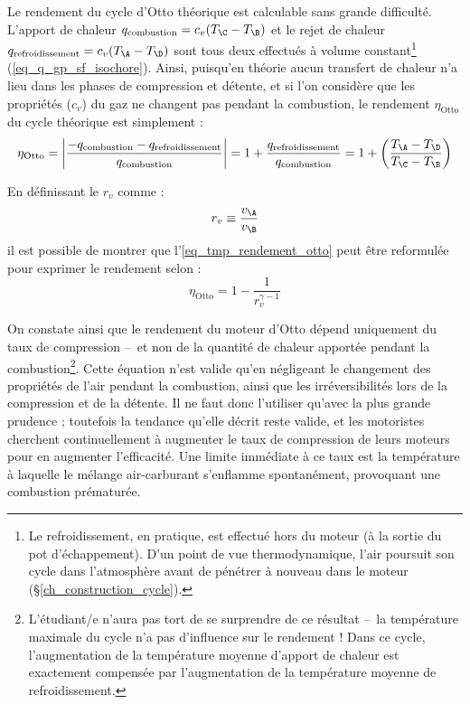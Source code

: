 		Le rendement du cycle d’Otto théorique est calculable sans grande difficulté. L’apport de chaleur $q_\text{combustion} = c_v (T_\C - T_\B )$ et le rejet de chaleur $q_\text{refroidissement} = c_v (T_\A - T_\D)$ sont tous deux effectués à volume constant\footnote{Le refroidissement, en pratique, est effectué hors du moteur (à la sortie du pot d’échappement). D’un point de vue thermodynamique, l’air poursuit son cycle dans l’atmosphère avant de pénétrer à nouveau dans le moteur (\S\ref{ch_construction_cycle}).} (\ref{eq_q_gp_sf_isochore}). Ainsi, puisqu’en théorie aucun transfert de chaleur n’a lieu dans les phases de compression et détente, et si l’on considère que les propriétés ($c_v$) du gaz ne changent pas pendant la combustion, le rendement $\eta_\text{Otto}$ du cycle théorique est simplement :
		\begin{equation}
			\eta_\text{Otto} = \left| \frac{-q_\text{combustion} - q_\text{refroidissement}}{q_\text{combustion}} \right| = 1 + \frac{q_\text{refroidissement}}{q_\text{combustion}} = 1 + \left( \frac{T_\A - T_\D}{T_\C - T_\B } \right) \label{eq_tmp_rendement_otto}
		\end{equation}

		En définissant le  $r_v$ comme :
		\begin{equation}
			r_v \equiv \frac{v_\A}{v_\B}
		\end{equation}
		il est possible de montrer que l’\cref{eq_tmp_rendement_otto} peut être reformulée pour exprimer le rendement selon :
		\begin{equation}
			\eta_\text{Otto} = 1 - \frac{1}{r_v^{\gamma -1}}
		\end{equation}

		On constate ainsi que le rendement du moteur d’Otto dépend uniquement du taux de compression --\ et non de la quantité de chaleur apportée pendant la combustion\footnote{L’étudiant/e n’aura pas tort de se surprendre de ce résultat --\ la température maximale du cycle n’a pas d’influence sur le rendement ! Dans ce cycle, l’augmentation de la température moyenne d’apport de chaleur est exactement compensée par l’augmentation de la température moyenne de refroidissement.}. Cette équation n’est valide qu’en négligeant le changement des propriétés de l’air pendant la combustion, ainsi que les irréversibilités lors de la compression et de la détente. Il ne faut donc l’utiliser qu’avec la plus grande prudence ; toutefois la tendance qu’elle décrit reste valide, et les motoristes cherchent continuellement à augmenter le taux de compression de leurs moteurs pour en augmenter l’efficacité. Une limite immédiate à ce taux est la température à laquelle le mélange air-carburant s’enflamme spontanément, provoquant une combustion prématurée.

